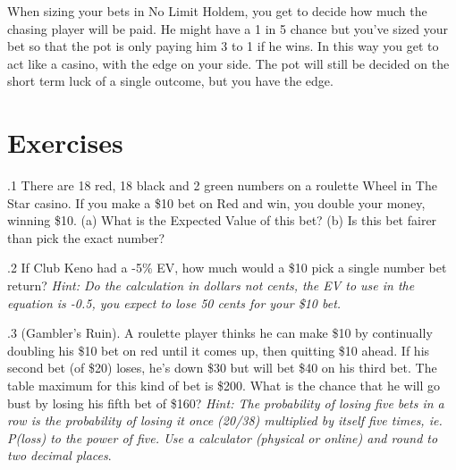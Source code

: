 When sizing your bets in No Limit Holdem, you get to decide how much
the chasing player will be paid. He might have a 1 in 5 chance
but you've sized your bet so that the pot is only paying him 3 to 1
if he wins. In this way you get to act like a casino, with the edge
on your side. The pot will still be decided on the short term luck
of a single outcome, but you have the edge.

\section{Exercises}


.1 There are 18 red, 18 black and 2 green numbers on
a roulette Wheel in The Star casino. If you make a \$10 bet on Red
and win, you double your money, winning \$10. (a) What is the Expected
Value of this bet? (b) Is this bet fairer than pick the exact number?

.2 If Club Keno had a -5\% EV, how much would a \$10
pick a single number bet return? \textit{Hint: Do the calculation in dollars not
cents, the EV to use in the equation is -0.5, you expect to lose 50 cents
for your \$10 bet.}

.3 (Gambler's Ruin). A roulette player thinks he
can make \$10 by continually doubling his \$10 bet on red until it
comes up, then quitting \$10 ahead. If his second bet (of \$20) loses,
he's down \$30 but will bet \$40 on his third bet. The table maximum
for this kind of bet is \$200. What is the chance that he will go bust
by losing his fifth bet of \$160? \textit{Hint: The probability of
losing five bets in a row is the probability of losing it once (20/38)
multiplied by itself five times, ie. P(loss) to the power of
five. Use a calculator (physical or online) and round to two
decimal places}.


